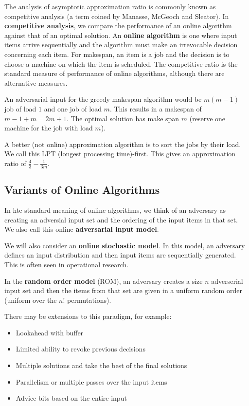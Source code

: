The analysis of asymptotic approximation ratio is commonly known as competitive analysis (a term coined by
Manasse, McGeoch and Sleator). In \textbf{competitive analysis}, we compare the performance of an online algorithm against that of an optimal solution. An \textbf{online algorithm} is one where input items arrive sequentially and the algorithm must make an irrevocable decision concerning each item. For makespan, an item is a job and the decision is to choose a machine on which the item is scheduled. The competitive ratio is the standard measure of performance of online algorithms, although there are alternative measures.

An adversarial input for the greedy makespan algorithm would be $m(m-1)$ job of load $1$ and one job of load $m$. This results in a makespan of $m-1+m = 2m+1$. The optimal solution has make span $m$ (reserve one machine for the job with load $m$).

A better (not online) approximation algorithm is to sort the jobs by their load. We call this LPT (longest processing time)-first. This gives an approximation ratio of $\frac{4}{3} - \frac{1}{3m}$.

\subsection{Variants of Online Algorithms}

In hte standard meaning of online algorithms, we think of an adversary as creating an adversial input set and the ordering of the input items in that set. We also call this online \textbf{adversarial input model}.

We will also consider an \textbf{online stochastic model}. In this model, an adversary defines an input distribution and then input items are sequentially generated. This is often seen in operational research.

In the \textbf{random order model} (ROM), an adversary creates a size $n$ adverserial input set and then the items from that set are given in a uniform random order (uniform over the $n!$ permutations).

There may be extensions to this paradigm, for example:
\begin{itemize}
    \item Lookahead with buffer
    \item Limited ability to revoke previous decisions
    \item Multiple solutions and take the best of the final solutions
    \item Parallelism or multiple passes over the input items
    \item Advice bits based on the entire input
\end{itemize}

